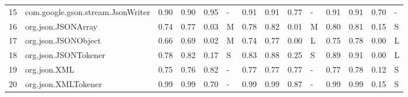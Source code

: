 \begin{table}[ht]
\begin{tabular}{rlrrrlrrrlrrrl}
  15 & com.google.gson.stream.JsonWriter & 0.90 & 0.90 & 0.95 & - & 0.91 & 0.91 & 0.77 & - & 0.91 & 0.91 & 0.70 & - \\ 
  16 & org.json.JSONArray & 0.74 & 0.77 & 0.03 & M & 0.78 & 0.82 & 0.01 & M & 0.80 & 0.81 & 0.15 & S \\ 
  17 & org.json.JSONObject & 0.66 & 0.69 & 0.02 & M & 0.74 & 0.77 & 0.00 & L & 0.75 & 0.78 & 0.00 & L \\ 
  18 & org.json.JSONTokener & 0.78 & 0.82 & 0.17 & S & 0.83 & 0.88 & 0.25 & S & 0.89 & 0.91 & 0.00 & L \\ 
  19 & org.json.XML & 0.75 & 0.76 & 0.82 & - & 0.77 & 0.77 & 0.77 & - & 0.77 & 0.78 & 0.12 & S \\ 
  20 & org.json.XMLTokener & 0.99 & 0.99 & 0.70 & - & 0.99 & 0.99 & 0.87 & - & 0.99 & 0.99 & 0.15 & S \\ 
   \hline
\end{tabular}
\end{table}
